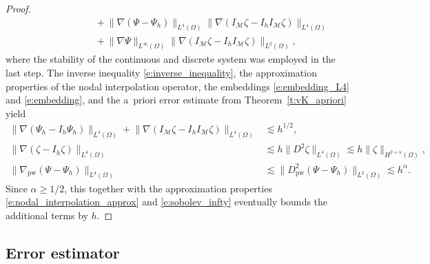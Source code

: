 \documentclass[a4paper]{amsart}
\theoremstyle{definition}
\numberwithin{equation}{section}
\numberwithin{theorem}{section}
\newcommand{\pw}{\mathrm{pw}}
\begin{document}
\begin{proof}
\begin{align*}
        &\qquad\qquad\qquad 
            + \lVert \nabla(\Psi - \Psi_h)\rVert_{L^4(\Omega)} 
              \lVert \nabla 
                 (I_\mathcal{M}\zeta-I_h I_\mathcal{M}\zeta)\rVert_{L^4(\Omega)} \\
        &\qquad\qquad\qquad 
            +\lVert \nabla \Psi\rVert_{L^\infty(\Omega)} 
              \lVert \nabla (I_\mathcal{M}\zeta-I_h I_\mathcal{M}\zeta)\rVert_{L^2(\Omega)},
    \end{align*}
    where the stability of the continuous and discrete system
    was employed in the last step.
    The inverse inequality \eqref{e:inverse_inequality},
    the approximation properties of the nodal interpolation 
    operator, the embeddings \eqref{e:embedding_L4} 
    and \eqref{e:embedding}, and the a~priori error
    estimate from Theorem~\ref{t:vK_apriori}
    yield
    \begin{align*}
        \lVert\nabla(\Psi_h-I_h\Psi_h)\rVert_{L^4(\Omega)}
        +\lVert \nabla 
                 (I_\mathcal{M}\zeta-I_h I_\mathcal{M}\zeta)\rVert_{L^4(\Omega)}
        &\lesssim h^{1/2},\\
        \lVert \nabla (\zeta-I_h\zeta)\rVert_{L^4(\Omega)}
        &\lesssim h \lVert D^2\zeta\rVert_{L^4(\Omega)}
        \lesssim h\lVert\zeta\rVert_{H^{2+\alpha}(\Omega)},\\
        \lVert \nabla_\pw(\Psi - \Psi_h)\rVert_{L^4(\Omega)} 
        &\lesssim \lVert D^2_\pw(\Psi - \Psi_h)\rVert_{L^2(\Omega)}
         \lesssim h^\alpha.
    \end{align*}
    Since $\alpha\geq 1/2$,
    this together with the approximation properties 
    \eqref{e:nodal_interpolation_approx}
    and \eqref{e:sobolev_infty} 
    eventually bounds the additional terms by $h$.
\end{proof}




\subsection{Error estimator} \label{ss:vK_errorest}
\end{document}
